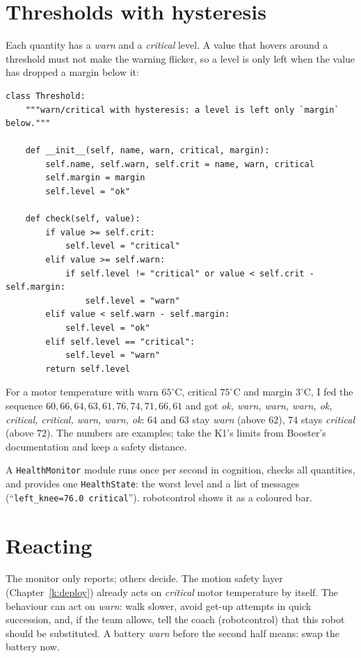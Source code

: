 \section*{Thresholds with hysteresis}
Each quantity has a \emph{warn} and a \emph{critical} level. A value that hovers around a threshold must not make the warning flicker, so a level is only left when the value has dropped a margin below it:
\begin{verbatim}
class Threshold:
    """warn/critical with hysteresis: a level is left only `margin` below."""

    def __init__(self, name, warn, critical, margin):
        self.name, self.warn, self.crit = name, warn, critical
        self.margin = margin
        self.level = "ok"

    def check(self, value):
        if value >= self.crit:
            self.level = "critical"
        elif value >= self.warn:
            if self.level != "critical" or value < self.crit - self.margin:
                self.level = "warn"
        elif value < self.warn - self.margin:
            self.level = "ok"
        elif self.level == "critical":
            self.level = "warn"
        return self.level
\end{verbatim}
For a motor temperature with warn $65^\circ$C, critical $75^\circ$C and margin $3^\circ$C, I fed the sequence $60,66,64,63,61,76,74,71,66,61$ and got \emph{ok, warn, warn, warn, ok, critical, critical, warn, warn, ok}: $64$ and $63$ stay \emph{warn} (above $62$), $74$ stays \emph{critical} (above $72$). The numbers are examples; take the K1's limits from Booster's documentation\guess{} and keep a safety distance.

A \texttt{HealthMonitor} module runs once per second in cognition, checks all quantities, and provides one \texttt{HealthState}: the worst level and a list of messages (``\texttt{left\_knee=76.0 critical}''). robotcontrol shows it as a coloured bar.

\section*{Reacting}
The monitor only reports; others decide. The motion safety layer (Chapter~\ref{k:deploy}) already acts on \emph{critical} motor temperature by itself. The behaviour can act on \emph{warn}: walk slower, avoid get-up attempts in quick succession, and, if the team allows, tell the coach (robotcontrol) that this robot should be substituted. A battery \emph{warn} before the second half means: swap the battery now.

